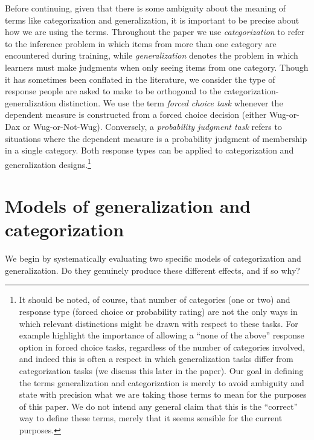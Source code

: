 \documentclass[doc,apacite]{apa6}
\begin{document}
Before continuing, given that there is some ambiguity about the meaning of terms like categorization and generalization, it is important to be precise about how we are using the terms. Throughout the paper we use {\it categorization} to refer to the inference problem in which items from more than one category are encountered during training, while {\it generalization} denotes the problem in which learners must make judgments when only seeing items from one category. Though it has sometimes been conflated in the literature, we consider the type of response people are asked to make to be orthogonal to the categorization-generalization distinction.
We use the term {\it forced choice task} whenever the dependent measure is constructed from a forced choice decision (either Wug-or-Dax or Wug-or-Not-Wug). Conversely, a {\it probability judgment task} refers to situations where the dependent measure is a probability judgment of membership in a single category. Both response types can be applied to categorization and generalization designs.\footnote{It should be noted, of course, that number of categories (one or two) and response type (forced choice or probability rating) are not the only ways in which relevant distinctions might be drawn with respect to these tasks. For example  highlight the importance of allowing a ``none of the above'' response option in forced choice tasks, regardless of the number of categories involved, and indeed this is often a respect in which generalization tasks differ from categorization tasks (we discuss this later in the paper). Our goal in defining the terms generalization and categorization is merely to avoid ambiguity and state with precision what we are taking those terms to mean for the purposes of this paper. We do not intend any  general claim that this is the ``correct'' way to define these terms, merely that it seems sensible for the current purposes.}

\section{Models of generalization and categorization}

We begin by systematically evaluating two specific models of categorization and generalization. Do they genuinely produce these different effects, and if so why?
\end{document}
